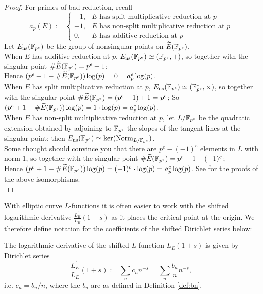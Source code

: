\documentclass[10pt]{article}
\newcommand{\pr}{^{\prime}}
\newcommand{\ldLe}[1]{\frac{L_E\pr}{L_E}\left(#1\right)}
\newcommand{\Ensfpe}{E_{\text{ns}}(\FF_{p^e})}
\begin{document}
\begin{proof}
For primes of bad reduction, recall
\begin{equation}
a_p(E) := \begin{cases}
+1, & \text{$E$ has split multiplicative reduction at $p$} \\
-1, & \text{$E$ has non-split multiplicative reduction at $p$} \\
0, & \text{$E$ has additive reduction at $p$}
\end{cases}
\end{equation}
Let $\Ensfpe$ be the group of nonsingular points on $\widetilde{E}(\mathbb{F}_{p^e})$. \\
When $E$ has additive reduction at $p$, $\Ensfpe \simeq (\F_{p^e},+)$, so together with the singular point $\#\widetilde{E}(\mathbb{F}_{p^e}) = p^e+1$; \\
Hence $(p^e + 1 - \#\widetilde{E}(\mathbb{F}_{p^e}))\log(p) = 0 = a_p^e \log(p)$. \\
When $E$ has split multiplicative reduction at $p$, $\Ensfpe \simeq (\F_{p^e}^*,\times)$, so together with the singular point $\#\widetilde{E}(\mathbb{F}_{p^e}) = (p^e-1)+1 = p^e$; So $(p^e + 1 - \#\widetilde{E}(\mathbb{F}_{p^e}))\log(p) = 1\cdot \log(p) = a_p^e \log(p)$. \\
When $E$ has non-split multiplicative reduction at $p$, let $L/\mathbb{F}_{p^e}$ be the quadratic extension obtained by adjoining to $\mathbb{F}_{p^e}$ the slopes of the tangent lines  at the singular point; then $\Ensfpe \simeq \ker(\Norm_{L/\FF_{p^e}})$. \\
Some thought should convince you that there are $p^e-(-1)^e$ elements in $L$ with norm 1, so together with the singular point $\#\widetilde{E}(\mathbb{F}_{p^e}) = p^e+1-(-1)^e$; \\
Hence $(p^e + 1 - \#\widetilde{E}(\mathbb{F}_{p^e}))\log(p) = (-1)^e\cdot \log(p) = a_p^e \log(p)$.
See \cite[pg. 180, Prop. 5.1]{Sil-1985} for the proofs of the above isomorphisms.\\
\end{proof}

With elliptic curve $L$-functions it is often easier to work with the shifted logarithmic derivative $\ldLe{1+s}$ as it places the critical point at the origin. We therefore define notation for the coefficients of the shifted Dirichlet series below:
\begin{definition}\label{def:cn}
The logarithmic derivative of the shifted $L$-function $L_E(1+s)$ is given by Dirichlet series
\begin{equation}
\ldLe{1+s} := \sum_n c_n n^{-s} = \sum_{n} \frac{b_n}{n} n^{-s},
\end{equation}
i.e. $c_n = b_n/n$, where the $b_n$ are as defined in Definition \ref{def:bn}.
\end{definition}
\end{document}
